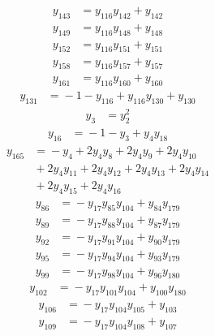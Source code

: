 \begin{align*}
y_{143} &={} y_{116}y_{142} +y_{142}
\end{align*}
\begin{align*}
y_{149} &={} y_{116}y_{148} +y_{148}
\end{align*}
\begin{align*}
y_{152} &={} y_{116}y_{151} +y_{151}
\end{align*}
\begin{align*}
y_{158} &={} y_{116}y_{157} +y_{157}
\end{align*}
\begin{align*}
y_{161} &={} y_{116}y_{160} +y_{160}
\end{align*}
\begin{align*}
y_{131} &={} -1 -y_{116} +y_{116}y_{130} +y_{130}
\end{align*}
\begin{align*}
y_{3} &={} y_{2}^{2}
\end{align*}
\begin{align*}
y_{16} &={} -1 -y_{3} +y_{4}y_{18}
\end{align*}
\begin{align*}
y_{165} &={} -y_{4} +2y_{4}y_{8} +2y_{4}y_{9} +2y_{4}y_{10} \\
 &{} +2y_{4}y_{11} +2y_{4}y_{12} +2y_{4}y_{13} +2y_{4}y_{14} \\
 &{} +2y_{4}y_{15} +2y_{4}y_{16}
\end{align*}
\begin{align*}
y_{86} &={} -y_{17}y_{85}y_{104} +y_{84}y_{179}
\end{align*}
\begin{align*}
y_{89} &={} -y_{17}y_{88}y_{104} +y_{87}y_{179}
\end{align*}
\begin{align*}
y_{92} &={} -y_{17}y_{91}y_{104} +y_{90}y_{179}
\end{align*}
\begin{align*}
y_{95} &={} -y_{17}y_{94}y_{104} +y_{93}y_{179}
\end{align*}
\begin{align*}
y_{99} &={} -y_{17}y_{98}y_{104} +y_{96}y_{180}
\end{align*}
\begin{align*}
y_{102} &={} -y_{17}y_{101}y_{104} +y_{100}y_{180}
\end{align*}
\begin{align*}
y_{106} &={} -y_{17}y_{104}y_{105} +y_{103}
\end{align*}
\begin{align*}
y_{109} &={} -y_{17}y_{104}y_{108} +y_{107}
\end{align*}
